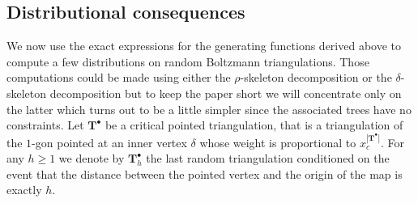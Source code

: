 \documentclass[AHL,XML,longabstracts,Unicode,NoSaveZebib]{cedram}
\begin{document}
\subsection{Distributional consequences}
We now use the exact expressions for the generating functions derived above to compute a few distributions on random Boltzmann triangulations. Those computations could be made using either the $\rho$-skeleton decomposition or the $\delta$-skeleton decomposition but to keep the paper short we will concentrate only on the latter which turns out to be a little simpler since the associated trees have no constraints. Let $ \mathbf{T}^{\bullet}$ be a critical pointed triangulation, that is a triangulation of the $1$-gon pointed at an inner vertex $\delta$ whose weight is proportional to $x_{c}^{| \mathbf{T}^\bullet|}$. For any $h \geq 1$ we denote by $  \mathbf{T}^{\bullet}_{h}$  the last random triangulation conditioned on the event that the distance between the pointed vertex and the origin of the map is exactly  $h$.
\end{document}
